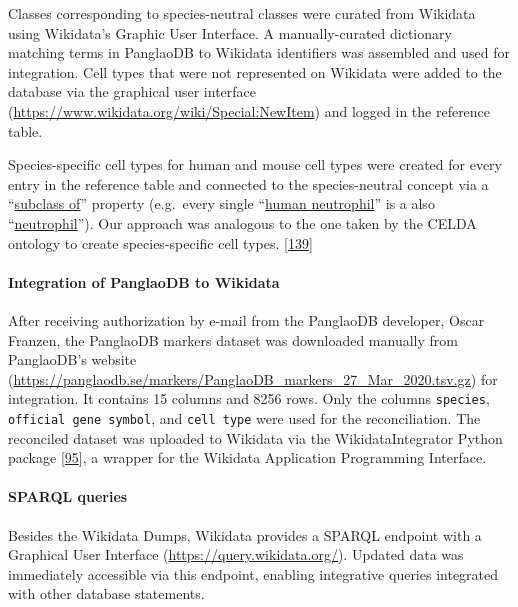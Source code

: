 Classes corresponding to species-neutral classes were curated from Wikidata using Wikidata's Graphic User Interface.
A manually-curated dictionary matching terms in PanglaoDB to Wikidata identifiers was assembled and used for integration.
Cell types that were not represented on Wikidata were added to the database via the graphical user interface (\url{https://www.wikidata.org/wiki/Special:NewItem}) and logged in the reference table.

Species-specific cell types for human and mouse cell types were created for every entry in the reference table and connected to the species-neutral concept via a ``\href{http://www.wikidata.org/entity/P279}{subclass of}'' property (e.g.~every single ``\href{http://www.wikidata.org/entity/Q101405102}{human neutrophil}'' is a also ``\href{http://www.wikidata.org/entity/Q188417}{neutrophil}'').
Our approach was analogous to the one taken by the CELDA ontology to create species-specific cell types. {[}\protect\hyperlink{ref-RLHsA1U8}{139}{]}

\hypertarget{integration-of-panglaodb-to-wikidata}{%
\paragraph{Integration of PanglaoDB to Wikidata}\label{integration-of-panglaodb-to-wikidata}}

After receiving authorization by e-mail from the PanglaoDB developer, Oscar Franzen, the PanglaoDB markers dataset was downloaded manually from PanglaoDB's website (\url{https://panglaodb.se/markers/PanglaoDB_markers_27_Mar_2020.tsv.gz}) for integration. It contains 15 columns and 8256 rows. Only the columns \texttt{species}, \texttt{official\ gene\ symbol}, and \texttt{cell\ type} were used for the reconciliation.
The reconciled dataset was uploaded to Wikidata via the WikidataIntegrator Python package {[}\protect\hyperlink{ref-qDI8I4IJ}{95}{]}, a wrapper for the Wikidata Application Programming Interface.

\hypertarget{sparql-queries}{%
\paragraph{SPARQL queries}\label{sparql-queries}}

Besides the Wikidata Dumps, Wikidata provides a SPARQL endpoint with a Graphical User Interface (\url{https://query.wikidata.org/}).
Updated data was immediately accessible via this endpoint, enabling integrative queries integrated with other database statements.

